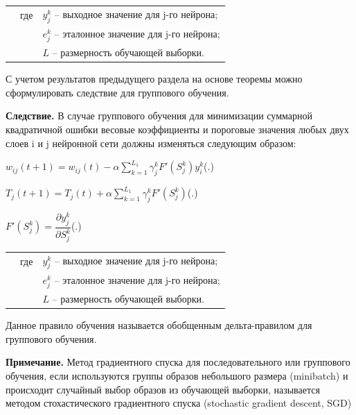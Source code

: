 	\begin{tabular}{p{}p{}p{}}
		& где  & $y_{j}^{k}$ {--} выходное значение для j-го нейрона; \\
		&      & $e_{j}^{k}$ {--} эталонное значение для j-го нейрона; \\
		&      & $L $ {--} размерность обучающей выборки. \\
	\end{tabular}
	
	\par \redline С учетом результатов предыдущего раздела на основе теоремы можно сформулировать следствие для группового обучения.
	
	\par \redline \textbf{Следствие.} В случае группового обучения для минимизации суммарной квадратичной ошибки весовые коэффициенты и пороговые значения любых двух слоев i и j нейронной сети должны изменяться следующим образом:
	
	\formulaspace \par \redline 
	$w_{ij}(t+1) = w_{ij}(t) - \alpha \sum \limits _{k=1}^{L_1} \gamma_{j}^{k} F'(S_{j}^{k})  y_{i}^{k}$\hfill (\thechaptercntr .\theformulacntr) \redline
	\formulaspace \addtocounter{formulacntr}{1}
	
	\formulaspace \par \redline 
	$T_{j}(t+1) = T_{j}(t) + \alpha \sum \limits _{k=1}^{L_1} \gamma_{j}^{k} F'(S_{j}^{k}) $\hfill (\thechaptercntr .\theformulacntr) \redline
	\formulaspace \addtocounter{formulacntr}{1}
	
		\formulaspace \par \redline 
	$ F'(S_{j}^{k}) = \dfrac{\partial y_{j}^{k}}{\partial S_{j}^{k}} $\hfill (\thechaptercntr .\theformulacntr) \redline
	\formulaspace \addtocounter{formulacntr}{1}
	
	\begin{tabular}{p{}p{}p{}}
		& где  & $y_{j}^{k}$ {--} выходное значение для j-го нейрона; \\
		&      & $e_{j}^{k}$ {--} эталонное значение для j-го нейрона; \\
		&      & $L $ {--} размерность обучающей выборки. \\
	\end{tabular}
	
	\par \redline Данное правило обучения называется обобщенным дельта-правилом для группового обучения.
	
	\par \redline \textbf{Примечание.} Метод градиентного спуска для последовательного или группового обучения, если используются группы образов небольшого размера (minibatch) и происходит случайный выбор образов из обучающей выборки, называется методом стохастического градиентного спуска (stochastic gradient descent, SGD)
	
